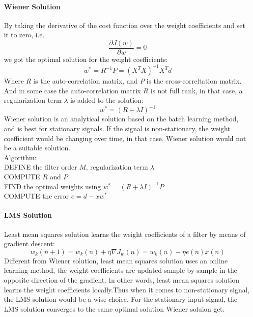 \documentclass[conference]{IEEEtran}
\begin{document}
		\paragraph{Wiener Solution} By taking the derivative of the cost function over the weight coefficients and set it to zero\cite{b2}, i.e. $$\frac{\partial J(w)}{\partial w} = 0$$
		we got the optimal solution for the weight coefficients: \begin{equation}w^{*} = R^{-1}P = (X^{T}X)^{-1}X^Td\label{eq2}\end{equation}
		Where $R$ is the auto-correlation matrix, and $P$ is the cross-correltation matrix. And in some case the auto-correlation matrix $R$ is not full rank, in that case, a regularization term $\lambda$ is added to the solution: 
		\begin{equation}w^{*} = (R+\lambda I)^{-1}\label{eq3}\end{equation}
		Wiener solution is an analytical solution based on the batch learning method, and is best for stationary signals. If the signal is non-stationary, the weight coefficient would be changing over time, in that case, Wiener solution would not be a suitable solution.\\
		Algorithm:\\
		 DEFINE the filter order $M$, regularization term $\lambda$\\
		COMPUTE $R$ and $P$\\
		FIND the optimal weights using $w^* = (R+\lambda I)^{-1}P$\\
		COMPUTE the error $e = d-xw^{*}$\\
	
		\paragraph{LMS Solution} Least mean squares solution learns the weight coefficients of a filter by means of gradient descent: \begin{equation}w_k(n+1) = w_k(n) + \eta \nabla J_w(n) = w_k(n) - \eta e(n)x(n)\label{eq4}\end{equation}
		Different from Wiener solution, least mean squares solution uses an online learning method, the weight coefficients are updated sample by sample in the opposite direction of the gradient. In other words, least mean squares solution learns the weight coefficients locally.Thus when it comes to non-stationary signal, the LMS solution would be a wise choice.
 For the stationary input signal, the LMS solution converges to the same optimal solution Wiener soluion get. 
\end{document}
